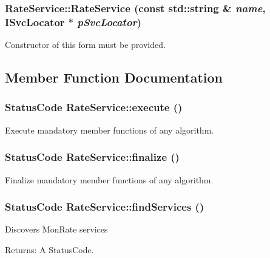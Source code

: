 \subsubsection{\setlength{\rightskip}{0pt plus 5cm}Rate\-Service::Rate\-Service (const std::string \& {\em name}, ISvc\-Locator $\ast$ {\em p\-Svc\-Locator})}\label{classRateService_a0}


Constructor of this form must be provided. 



\subsection{Member Function Documentation}
\subsubsection{\setlength{\rightskip}{0pt plus 5cm}Status\-Code Rate\-Service::execute ()}\label{classRateService_a2}


Execute mandatory member functions of any algorithm. 

\subsubsection{\setlength{\rightskip}{0pt plus 5cm}Status\-Code Rate\-Service::finalize ()}\label{classRateService_a3}


Finalize mandatory member functions of any algorithm. 

\subsubsection{\setlength{\rightskip}{0pt plus 5cm}Status\-Code Rate\-Service::find\-Services ()\hspace{0.3cm}{\tt  [private]}}\label{classRateService_d1}


Discovers Mon\-Rate services

\begin{Desc}
\item[Returns:]A Status\-Code. \end{Desc}

